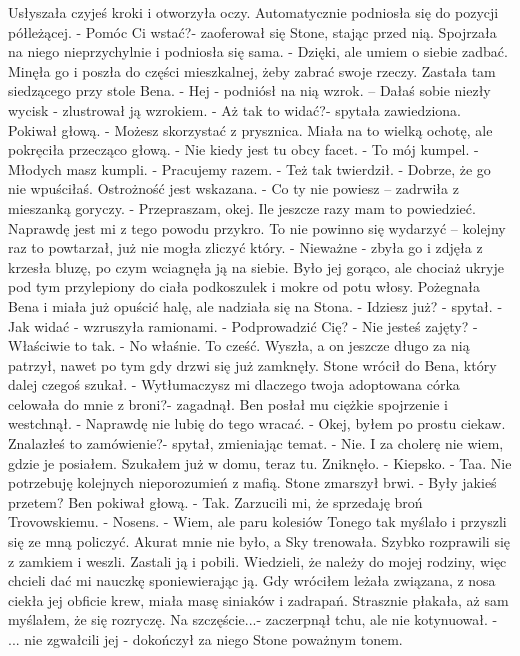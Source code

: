 \documentclass[12pt,a4paper]{book}
\begin{document}
Usłyszała czyjeś kroki i otworzyła oczy. Automatycznie podniosła się do pozycji półleżącej. 
- Pomóc Ci wstać?- zaoferował się Stone, stając przed nią. 
Spojrzała na niego nieprzychylnie i podniosła się sama. 
- Dzięki, ale umiem o siebie zadbać.
Minęła go i poszła do części mieszkalnej, żeby zabrać swoje rzeczy. Zastała tam siedzącego przy stole Bena. 
- Hej - podniósł na nią wzrok. – Dałaś sobie niezły wycisk - zlustrował ją wzrokiem.
- Aż tak to widać?- spytała zawiedziona.
Pokiwał głową. 
- Możesz skorzystać z prysznica. 
Miała na to wielką ochotę, ale pokręciła przecząco głową.
- Nie kiedy jest tu obcy facet. 
- To mój kumpel. 
- Młodych masz kumpli.
- Pracujemy razem. 
- Też tak twierdził.
- Dobrze, że go nie wpuściłaś. Ostrożność jest wskazana. 
- Co ty nie powiesz – zadrwiła z mieszanką goryczy. 
- Przepraszam, okej. Ile jeszcze razy mam to powiedzieć. Naprawdę jest mi z tego powodu przykro. To nie powinno się wydarzyć – kolejny raz to powtarzał, już nie mogła zliczyć który. 
- Nieważne - zbyła go i zdjęła z krzesła bluzę, po czym wciagnęła ją na siebie. 
Było jej gorąco, ale chociaż ukryje pod tym przylepiony do ciała podkoszulek i mokre od potu włosy. Pożegnała Bena i miała już opuścić halę, ale nadziała się na Stona. 
- Idziesz już? - spytał.
- Jak widać - wzruszyła ramionami.
- Podprowadzić Cię?
- Nie jesteś zajęty?
- Właściwie to tak.
- No właśnie. To cześć. 
Wyszła, a on jeszcze długo za nią patrzył, nawet po tym gdy drzwi się już zamknęły. 
Stone wrócił do Bena, który dalej czegoś szukał.
- Wytłumaczysz mi dlaczego twoja adoptowana córka celowała do mnie z broni?- zagadnął.
Ben posłał mu ciężkie spojrzenie i westchnął.
- Naprawdę nie lubię do tego wracać. 
- Okej, byłem po prostu ciekaw. Znalazłeś to zamówienie?- spytał, zmieniając temat.
- Nie. I za cholerę nie wiem, gdzie je posiałem. Szukałem już w domu, teraz tu. Zniknęło.
- Kiepsko. 
- Taa. Nie potrzebuję kolejnych nieporozumień z mafią.
Stone zmarszył brwi.
- Były jakieś przetem?
Ben pokiwał głową.
- Tak. Zarzucili mi, że sprzedaję broń Trovowskiemu.
- Nosens.
- Wiem, ale paru kolesiów Tonego tak myślało i przyszli się ze mną policzyć. Akurat mnie nie było, a Sky trenowała. Szybko rozprawili się z zamkiem i weszli. Zastali ją i pobili. Wiedzieli, że należy do mojej rodziny, więc chcieli dać mi nauczkę sponiewierając ją. Gdy wróciłem leżała związana, z nosa ciekła jej obficie krew, miała masę siniaków i zadrapań. Strasznie płakała, aż sam myślałem, że się rozryczę. Na szczęście...- zaczerpnął tchu, ale nie kotynuował.
- ... nie zgwałcili jej - dokończył za niego Stone poważnym tonem.
\end{document}
